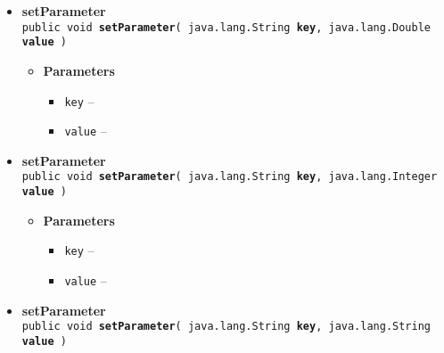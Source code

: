{{{\begin{itemize}
{{\bf setCallbackObject}\\
{\tt public void\ {\bf setCallbackObject}( {\tt AirBrushCallable} {\bf cb} )
\label{amber.common.AirBrush.setCallbackObject(amber.common.AirBrushCallable)}}%
\begin{itemize}
\item{
{\bf Parameters}
  \begin{itemize}
   \item{
{\tt cb} -- }
  \end{itemize}
}%
\end{itemize}
}%
 \item{ 
{\bf setParameter}\\
{\tt public void\ {\bf setParameter}( {\tt java.lang.String} {\bf key},
{\tt java.lang.Double} {\bf value} )
\label{amber.common.AirBrush.setParameter(java.lang.String, java.lang.Double)}}%
\begin{itemize}
\item{
{\bf Parameters}
  \begin{itemize}
   \item{
{\tt key} -- }
   \item{
{\tt value} -- }
  \end{itemize}
}%
\end{itemize}
}%
 \item{ 
{\bf setParameter}\\
{\tt public void\ {\bf setParameter}( {\tt java.lang.String} {\bf key},
{\tt java.lang.Integer} {\bf value} )
\label{amber.common.AirBrush.setParameter(java.lang.String, java.lang.Integer)}}%
\begin{itemize}
\item{
{\bf Parameters}
  \begin{itemize}
   \item{
{\tt key} -- }
   \item{
{\tt value} -- }
  \end{itemize}
}%
\end{itemize}
}%
 \item{ 
{\bf setParameter}\\
{\tt public void\ {\bf setParameter}( {\tt java.lang.String} {\bf key},
{\tt java.lang.String} {\bf value} )
\label{amber.common.AirBrush.setParameter(java.lang.String, java.lang.String)}}%
\begin{itemize}

\end{itemize}}
\end{itemize}}}}
